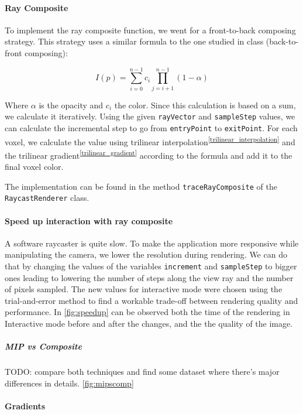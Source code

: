 \documentclass[a4paper]{article}
\begin{document}
\paragraph{Ray Composite}
\label{ray_composite}

To implement the ray composite function, we went for a front-to-back composing strategy. This strategy uses a similar formula to the one studied in class (back-to-front composing):

$$I(p)=\sum^{n-1}_{i=0}c_i\prod^{n-1}_{j=i+1}(1-\alpha)$$

Where $\alpha$ is the opacity and $c_i$ the color. Since this calculation is based on a sum, we calculate it iteratively. Using the given {\tt rayVector} and {\tt sampleStep} values, we can calculate the incremental step to go from {\tt entryPoint} to {\tt exitPoint}. For each voxel, we calculate the value using trilinear interpolation\textsuperscript{\autoref{trilinear_interpolation}} and the trilinear gradient\textsuperscript{\autoref{trilinear_gradient}} according to the formula and add it to the final voxel color.

The implementation can be found in the method {\tt traceRayComposite} of the {\tt RaycastRenderer} class.

\paragraph{Speed up interaction with ray composite}
\label{speed_up}

A software raycaster is quite slow. To make the application more responsive while manipulating the camera, we lower the resolution during rendering. We can do that by changing the values of the variables {\tt increment} and {\tt sampleStep} to bigger ones leading to lowering the number of steps along the view ray and the number of pixels sampled.  The new values for interactive mode were chosen using the trial-and-error method to find a workable trade-off between rendering quality and performance. In \autoref{fig:speedup} can be observed both the time of the rendering in Interactive mode before and after the changes, and the the quality of the image.

\subparagraph{MIP vs Composite}

TODO: compare both techniques and find some dataset where there's major differences in details. \autoref{fig:mipscomp}

\paragraph{Gradients}
\label{subsec:gradients}
\end{document}
